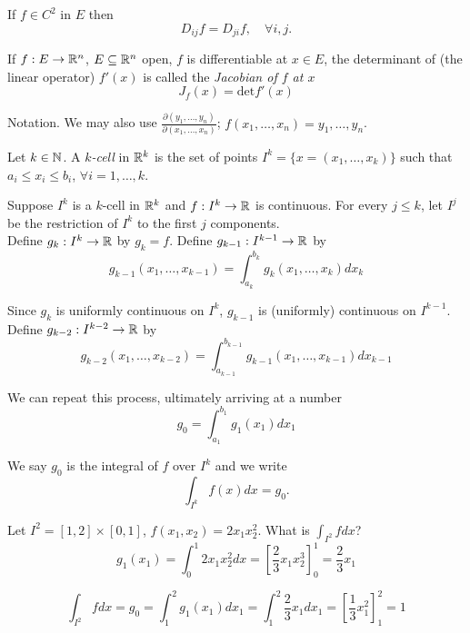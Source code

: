 \documentclass[11pt]{article}
\begin{document}
\begin{theorem} If $f \in C^2$ in $E$ then $$D_{ij}f = D_{ji}f, \quad \forall i, j.$$
\end{theorem}

\begin{definition}
  If $f: E \to \mathbb{R}^n$, $E \subseteq \mathbb{R}^n$ open, $f$ is differentiable at $x \in E$, the determinant of (the linear operator) $f'(x)$ is called the \emph{Jacobian of $f$ at $x$} $$J_f(x) = \mathrm{det} f'(x)$$
\end{definition}

Notation. We may also use $\frac{\partial (y_1, \dots, y_n)}{\partial (x_1, \dots, x_n)}$; $f(x_1, \dots, x_n) = y_1, \dots, y_n$.

\begin{definition} Let $k \in \mathbb{N}$. A \emph{$k$-cell} in $\mathbb{R}^k$ is the set of points $I^k = \{ x = (x_1, \dots, x_k) \}$ such that $a_i \le x_i \le b_i$, $\forall i = 1, \dots, k$.
\end{definition}

Suppose $I^k$ is a $k$-cell in $\mathbb{R}^k$ and $f: I^k \to \mathbb{R}$ is continuous. For every $j \le k$, let $I^j$ be the restriction of $I^k$ to the first $j$ components.\\

Define $g_k: I^k \to \mathbb{R}$ by $g_k= f$. Define $g_{k - 1}: I^{k - 1} \to \mathbb{R}$ by $$g_{k - 1}(x_1, \dots, x_{k-1}) = \int_{a_k}^{b_k}g_k(x_1, \dots, x_k) d x_k$$

Since $g_k$ is uniformly continuous on $I^k$, $g_{k - 1}$ is (uniformly) continuous on $I^{k - 1}$. Define $g_{k - 2}: I^{k - 2} \to \mathbb{R}$ by $$g_{k - 2}(x_1, \dots, x_{k - 2}) = \int_{a_{k - 1}}^{b_{k - 1}}g_{k - 1}(x_1, \dots, x_{k - 1}) dx_{k - 1}$$

We can repeat this process, ultimately arriving at a number $$g_0 = \int_{a_1}^{b_1} g_1(x_1) dx_1$$

We say $g_0$ is the integral of $f$ over $I^k$ and we write $$\int_{I^k} f(x) dx = g_0.$$

\begin{example}
  Let $I^2 = [1, 2] \times [0, 1]$, $f(x_1, x_2) = 2x_1x_2^2$. What is $\int_{I^2} f dx$? \\

  $$g_1(x_1) = \int_0^1 2x_1x_2^2 dx = \left[ \frac{2}{3} x_1x_2^3 \right]_0^1 = \frac{2}{3} x_1 $$

  $$\int_{I^2} f dx = g_0 = \int_1^2 g_1(x_1) dx_1 = \int_1^2 \frac{2}{3} x_1 dx_1 = \left[ \frac{1}{3} x_1^2 \right]_1^2 = 1$$
\end{example}
\end{document}
